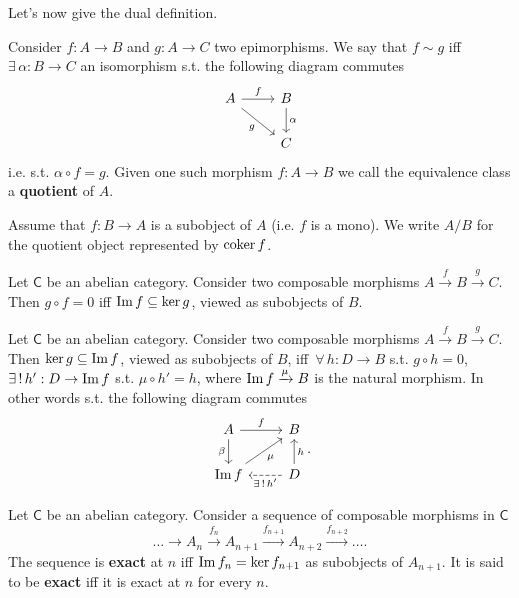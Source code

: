 Let's now give the dual definition.
\begin{defn}[Quotient]
	Consider $f: A \to B$ and $g: A \to C$ two epimorphisms.
	We say that $f \sim g$ iff $\exists\, \alpha: B \to C$ an isomorphism s.t. the following diagram commutes
	\begin{equation}
	\begin{tikzcd}
		A \arrow[r, "f", rightarrow] \arrow[rd, "g"', rightarrow] &
		B \arrow[d, "\alpha", rightarrow] \\
		& C
	\end{tikzcd}
	\end{equation} 
	i.e. s.t. $\alpha \circ f = g$.
	Given one such morphism $f: A \to B$ we call the equivalence class a \textbf{quotient} of $A$.
\end{defn}
\begin{rem}[notation]
	Assume that $f: B \to A$ is a subobject of $A$ (i.e. $f$ is a mono).
	We write $A/B$ for the quotient object represented by $\operatorname{coker} f$.
\end{rem}

\begin{lem}
	Let $\mathsf{C}$ be an abelian category.
	Consider two composable morphisms $A \xrightarrow{f} B \xrightarrow{g} C$.
	Then $g \circ f = 0$ iff $\operatorname{Im} f \subseteq \ker g$, viewed as subobjects of $B$.
\end{lem} 

\begin{lem}
	Let $\mathsf{C}$ be an abelian category.
	Consider two composable morphisms $A \xrightarrow{f} B \xrightarrow{g} C$.
	Then $\ker g \subseteq \operatorname{Im} f$, viewed as subobjects of $B$, iff $\,\forall\, h: D \to B$ s.t.
	$g \circ h = 0$, $\exists\, !\, h': D \to \operatorname{Im} f$ s.t. $\mu \circ h' = h$, where $\operatorname{Im} f \xrightarrow{\mu} B$ is the natural morphism.
	In other words s.t. the following diagram commutes
	\begin{equation}
	\begin{tikzcd}
		A \arrow[r, "f", rightarrow] \arrow[d, "\beta"', rightarrow] &
		B\\
		\Ima f \arrow[ur, "\mu"', rightarrow] &
		D \arrow[u, "h"', rightarrow] \arrow[l, "\exists\, !\, h'", dashrightarrow] 
	\end{tikzcd}
	.\end{equation} 
\end{lem} 

\begin{defn}
	Let $\mathsf{C}$ be an abelian category.
	Consider a sequence of composable morphisms in $\mathsf{C}$
	\begin{equation}
	\ldots \to A_n \xrightarrow{f_n} 
	A_{n+1}  \xrightarrow{f_{n + 1}} 
	A_{n+2} \xrightarrow{f_{n + 2}} \ldots
	.\end{equation} 
	The sequence is \textbf{exact} at $n$ iff
	$\operatorname{Im} f_n = \ker f_{n+1}$ as subobjects of $A_{n + 1}$.
	It is said to be \textbf{exact} iff it is exact at $n$ for every $n$.
\end{defn}

